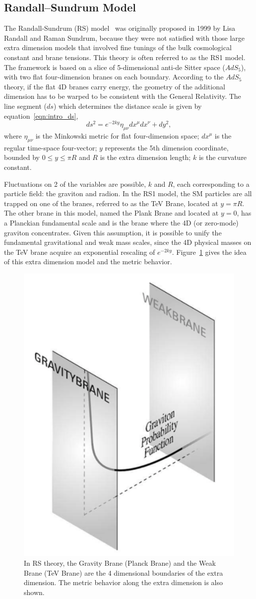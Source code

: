 \subsection{Randall–Sundrum Model}
The Randall-Sundrum (RS) model~\cite{Intro_RS1} was originally proposed in 1999 by Lisa Randall and Raman Sundrum, because they were not satisfied with those large extra dimension models that involved fine tunings of the bulk cosmological constant and brane tensions. This theory is often referred to as the RS1 model. The framework is based on a slice of 5-dimensional anti-de Sitter space ($AdS_{5}$), with two flat four-dimension branes on each boundary. According to the $AdS_{5}$ theory, if the flat 4D branes carry energy, the geometry of the additional dimension has to be warped to be consistent with the General Relativity. The line segment ($ds$) which determines the distance scale is given by equation~\ref{eqn:intro_ds},
\begin{equation}
ds^2 = e^{-2ky}{\eta}_{\mu\nu}{dx}^{\mu}{dx}^{\nu}+dy^2,
\label{eqn:intro_ds}
\end{equation}
where ${\eta}_{\mu\nu}$ is the Minkowski metric for flat four-dimension space; ${dx}^{\mu}$ is the regular time-space four-vector; $y$ represents the 5th dimension coordinate, bounded by $0\leq y \leq \pi R$ and $R$ is the extra dimension length; $k$ is the curvature constant.

\vspace{0.3cm}
Fluctuations on 2 of the variables are possible, $k$ and $R$, each corresponding to a particle field: the graviton and radion. In the RS1 model, the SM particles are all trapped on one of the branes, referred to as the TeV Brane, located at $y=\pi R$. The other brane in this model, named the Plank Brane and located at $y=0$, has a Planckian fundamental scale and is the brane where the 4D (or zero-mode) graviton concentrates. Given this assumption, it is possible to unify the fundamental gravitational and weak mass scales, since the 4D physical masses on the TeV brane acquire an exponential rescaling of $e^{-2ky}$. Figure~\ref{fig:intro_branes} gives the idea of this extra dimension model and the metric behavior.
\begin{figure}[htbp]
\begin{center}
\includegraphics[width=0.32\linewidth]{figures/intro_branes.png}
\caption{In RS theory, the Gravity Brane (Planck Brane) and the Weak Brane (TeV Brane) are the 4 dimensional boundaries of the extra dimension. The metric behavior along the extra dimension is also shown.}
\label{fig:intro_branes}
\end{center}
\end{figure}

